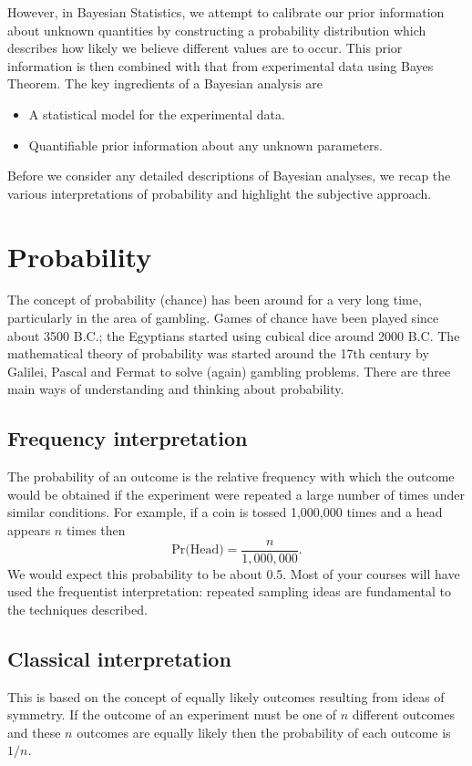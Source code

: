 However, in Bayesian Statistics, we attempt to calibrate our prior
information about unknown quantities by constructing a probability
distribution which describes how likely we believe different values
are to occur. This prior information is then combined with that from
experimental data using Bayes Theorem. The key ingredients of a
Bayesian analysis are
\begin{itemize}
\item A statistical model for the experimental data.
\item Quantifiable prior information about any unknown parameters.
\end{itemize}
Before we consider any detailed descriptions of Bayesian analyses, we
recap the various interpretations of probability and highlight the
subjective approach.

\section{Probability}
The concept of probability (chance) has been around for a very long
time, particularly in the area of gambling. Games of chance have been
played since about 3500 B.C.; the Egyptians started using cubical dice
around 2000 B.C. The mathematical theory of probability was started
around the 17th century by Galilei, Pascal and Fermat to solve (again)
gambling problems. There are three main ways of understanding and
thinking about probability.

\subsection*{Frequency interpretation}
The probability of an outcome is the relative frequency with which the
outcome would be obtained if the experiment were repeated a large
number of times under similar conditions. For example, if a coin is
tossed 1,000,000 times and a head appears $n$ times then
$$
\text{Pr(Head)}=\frac{n}{1,000,000}.
$$ 
We would expect this probability to be about 0.5.  Most of your
courses will have used the frequentist interpretation: repeated
sampling ideas are fundamental to the techniques described.

\subsection*{Classical interpretation}
This is based on the concept of equally likely outcomes resulting from
ideas of symmetry. If the
outcome of an experiment must be one of $n$ different outcomes and
these $n$ outcomes are equally likely then the probability of each
outcome is $1/n$.

